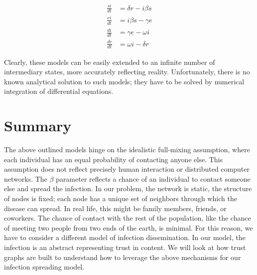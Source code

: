 \begin{equation}
\begin{split}
\frac{si}{dt} &= \delta r - i \beta s \\
\frac{ei}{dt} &= i \beta s - \gamma e \\
\frac{di}{dt} &= \gamma e - \omega i \\
\frac{dr}{dt} &= \omega i - \delta r
\end{split}
\end{equation}


Clearly, these models can be easily extended to an infinite number of intermediary states, more accurately reflecting reality. Unfortunately, there is no known analytical solution to such models; they have to be solved by numerical integration of differential equations.

\section{Summary}
The above outlined models hinge on the idealistic full-mixing assumption, where each individual has an equal probability of contacting anyone else. This assumption does not reflect precisely human interaction or distributed computer networks. The $\beta$  parameter reflects a chance of an individual to contact someone else and spread the infection. In our problem, the network is static, the structure of nodes is fixed; each node has a unique set of neighbors through which the disease can spread. In real life, this might be family members, friends, or coworkers. The chance of contact with the rest of the population, like the chance of meeting two people from two ends of the earth, is minimal. For this reason, we have to consider a different model of infection dissemination. 
In our model, the infection is an abstract representing trust in content. We will look at how trust graphs are built to understand how to leverage the above mechanisms for our infection spreading model.